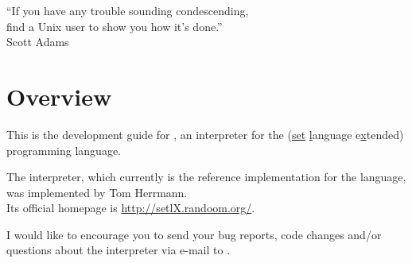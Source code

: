 


\globalDate{\today}
\globalKeywords{}







\begin{titlepage}
\maketitle

\vfill

\begin{center}
\Large
``If you have any trouble sounding condescending,\\
find a Unix user to show you how it's done.''\\
Scott Adams
\end{center}

\vfill
\end{titlepage}

\tableofcontents

\newpage

\section{Overview}

This is the development guide for \setlX, an interpreter for the \SetlX{} (\underline{set} \underline{l}anguage e\underline{x}tended) programming language.

The \setlX{} interpreter, which currently is the reference implementation for the \SetlX{} language, was implemented by Tom Herrmann.\\
Its official homepage is \url{http://setlX.randoom.org/}.

I would like to encourage you to send your bug reports, code changes and\slash{}or questions about the \setlX{} interpreter via e-mail to .

